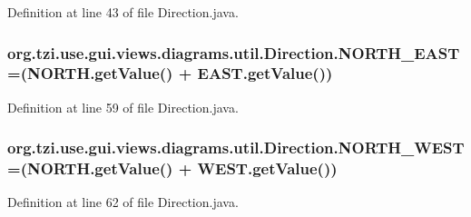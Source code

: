 Definition at line 43 of file Direction.\-java.

\hypertarget{enumorg_1_1tzi_1_1use_1_1gui_1_1views_1_1diagrams_1_1util_1_1_direction_ae70c40ae91d0ad9d81b8a3392a042bc8}{
\subsubsection[{N\-O\-R\-T\-H\-\_\-\-E\-A\-S\-T}]{\setlength{\rightskip}{0pt plus 5cm}org.\-tzi.\-use.\-gui.\-views.\-diagrams.\-util.\-Direction.\-N\-O\-R\-T\-H\-\_\-\-E\-A\-S\-T =(N\-O\-R\-T\-H.\-get\-Value() + E\-A\-S\-T.\-get\-Value())}}\label{enumorg_1_1tzi_1_1use_1_1gui_1_1views_1_1diagrams_1_1util_1_1_direction_ae70c40ae91d0ad9d81b8a3392a042bc8}


Definition at line 59 of file Direction.\-java.

\hypertarget{enumorg_1_1tzi_1_1use_1_1gui_1_1views_1_1diagrams_1_1util_1_1_direction_a61846d30d085febab60863ac2bf9c012}{
\subsubsection[{N\-O\-R\-T\-H\-\_\-\-W\-E\-S\-T}]{\setlength{\rightskip}{0pt plus 5cm}org.\-tzi.\-use.\-gui.\-views.\-diagrams.\-util.\-Direction.\-N\-O\-R\-T\-H\-\_\-\-W\-E\-S\-T =(N\-O\-R\-T\-H.\-get\-Value() + W\-E\-S\-T.\-get\-Value())}}\label{enumorg_1_1tzi_1_1use_1_1gui_1_1views_1_1diagrams_1_1util_1_1_direction_a61846d30d085febab60863ac2bf9c012}


Definition at line 62 of file Direction.\-java.

